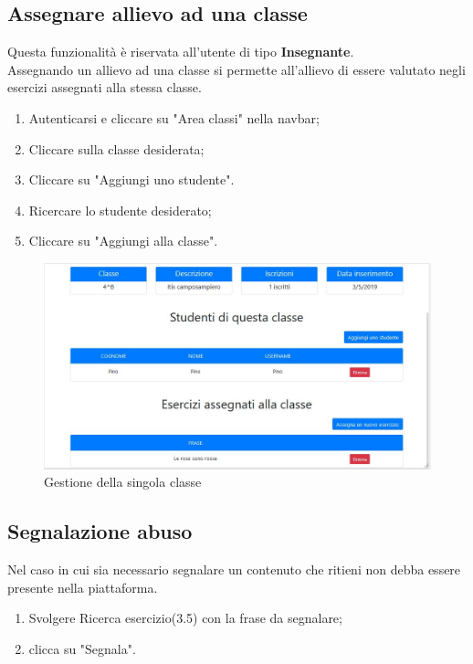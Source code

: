 \documentclass[11pt,a4paper]{article}
\begin{document}
{		\subsection{Assegnare allievo ad una classe}
		Questa funzionalità è riservata all'utente di tipo \textbf{Insegnante}.\\
		Assegnando un allievo ad una classe si permette all'allievo di essere valutato negli esercizi assegnati alla stessa classe.
		
		\begin{enumerate}
			\item Autenticarsi e cliccare su "Area classi" nella navbar;
			\item Cliccare sulla classe desiderata;
			\item Cliccare su "Aggiungi uno studente".
			\item Ricercare lo studente desiderato;
			\item Cliccare su "Aggiungi alla classe".
		\end{enumerate}
	
		\begin{figure}[h!]
		\centering
		\includegraphics[scale=0.65]{images/gestioneclasse.jpg}
		\caption{Gestione della singola classe}
	\end{figure}
			
	\newpage
	\subsection{Segnalazione abuso}
	Nel caso in cui sia necessario segnalare un contenuto che ritieni non debba essere presente nella piattaforma.
	\begin{enumerate}
		\item Svolgere Ricerca esercizio(3.5) con la frase da segnalare;
		\item clicca su "Segnala".
	\end{enumerate}
	
}
\end{document}
